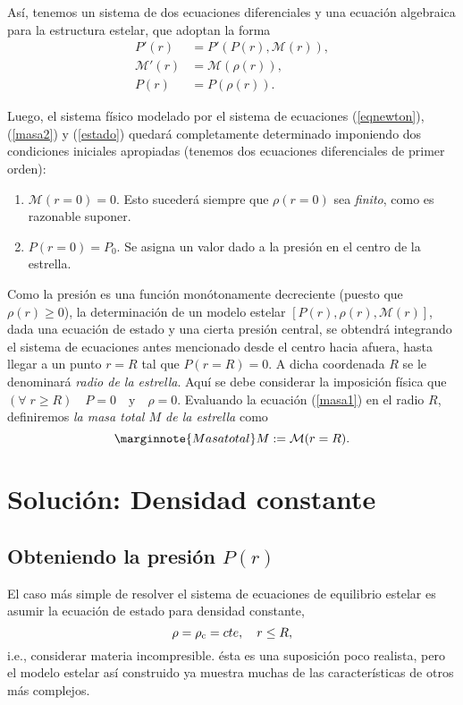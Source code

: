 Así, tenemos un sistema de dos ecuaciones diferenciales y una ecuación algebraica para la estructura estelar, que adoptan la forma
\begin{align}
 P'(r)&=P'(P(r),\mathcal{M}(r)),\\
\mathcal{M}'(r)&=\mathcal{M}(\rho(r)),\\
P(r)&=P(\rho(r)).
\end{align}

Luego, el sistema físico modelado por el sistema de ecuaciones (\ref{eqnewton}), (\ref{masa2}) y (\ref{estado}) quedará completamente determinado imponiendo dos condiciones iniciales apropiadas (tenemos dos ecuaciones diferenciales de primer orden):
\begin{enumerate}
 \item $\mathcal{M}(r=0)=0$. Esto sucederá siempre que $\rho(r=0)$ sea \textit{finito}, como es razonable suponer.
 \item $P(r=0)=P_0$. Se asigna un valor dado a la presión en el centro de la estrella.
\end{enumerate}

Como la presión  es una función monótonamente decreciente (puesto que $\rho(r)\geq0$), la determinación de un modelo estelar $[P(r), \rho(r),\mathcal{M}(r)]$, dada una ecuación de estado y una cierta presión central, se obtendrá integrando el sistema de ecuaciones antes mencionado desde el centro hacia afuera, hasta llegar a un punto $r=R$ tal que $P(r=R)=0$. A dicha coordenada $R$ se le denominará \textit{radio de la estrella}. Aquí se debe considerar la imposición física que $(\forall\; r\geq R) \quad P=0 \quad\mbox{y}\quad \rho=0$. Evaluando la ecuación (\ref{masa1}) en el radio $R$, definiremos \textit{la masa total $M$ de la estrella}  como
\begin{equation}\marginnote{Masa total}
M:=\mathcal{M}(r=R).
\end{equation}



\section{Solución: Densidad constante}
\subsection{Obteniendo la presión  \texorpdfstring{$P(r)$}{P(r)}}
El caso más simple de resolver el sistema de ecuaciones de equilibrio estelar es asumir la ecuación de estado para densidad constante,
\begin{equation}\label{cte0}
\rho=\rho_{\rm c}=cte,\quad r\leq R,
\end{equation}
i.e., considerar materia incompresible. ésta es una suposición poco realista, pero el modelo estelar así construido ya muestra muchas de las características de otros más complejos.

